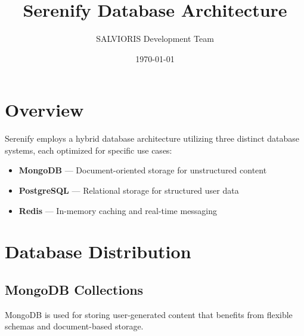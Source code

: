 \documentclass[11pt,a4paper]{article}
\title{\textbf{Serenify Database Architecture}}
\author{SALVIORIS Development Team}
\date{\today}
\begin{document}
\maketitle

\section{Overview}

Serenify employs a hybrid database architecture utilizing three distinct database systems, each optimized for specific use cases:

\begin{itemize}
    \item \textcolor{mongogreen}{\textbf{MongoDB}} --- Document-oriented storage for unstructured content
    \item \textcolor{postgresblue}{\textbf{PostgreSQL}} --- Relational storage for structured user data
    \item \textcolor{redisred}{\textbf{Redis}} --- In-memory caching and real-time messaging
\end{itemize}

\section{Database Distribution}

\subsection{\textcolor{mongogreen}{MongoDB Collections}}

MongoDB is used for storing user-generated content that benefits from flexible schemas and document-based storage.
\end{document}
